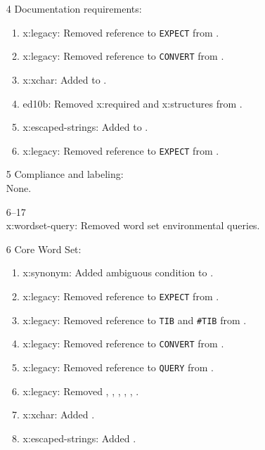 \begin{itemize}
	\item[4] Documentation requirements:
		\begin{enumerate}
		\item \textsf{x:legacy}: Removed reference to \texttt{EXPECT} from
			.
		\item \textsf{x:legacy}: Removed reference to \texttt{CONVERT} from
			.
		\item \textsf{x:xchar}: Added  to 
			.
		\item \textsf{ed10b}: Removed \textsf{x:required} and
			\textsf{x:structures} from .
		\item \textsf{x:escaped-strings}: Added  to .
		\item \textsf{x:legacy}: Removed reference to \texttt{EXPECT} from
			.
		\end{enumerate}

	\item[5] Compliance and labeling: \\
		None.

	\item[6--17] ~\\
		\textsf{x:wordset-query}: Removed word set environmental queries.

	\item[6] Core Word Set:
		\begin{enumerate}
		\item \textsf{x:synonym}: Added ambiguous condition to .
		\item \textsf{x:legacy}: Removed reference to \texttt{EXPECT} from
			.
		\item \textsf{x:legacy}: Removed reference to \texttt{TIB} and
			\texttt{\#TIB} from .
		\item \textsf{x:legacy}: Removed reference to \texttt{CONVERT} from
			.
		\item \textsf{x:legacy}: Removed reference to \texttt{QUERY} from
			.
		\item \textsf{x:legacy}: Removed ,
			,
			,
			,
			,
			.
		\item \textsf{x:xchar}: Added .
		\item \textsf{x:escaped-strings}: Added .
		\end{enumerate}


\end{itemize}
